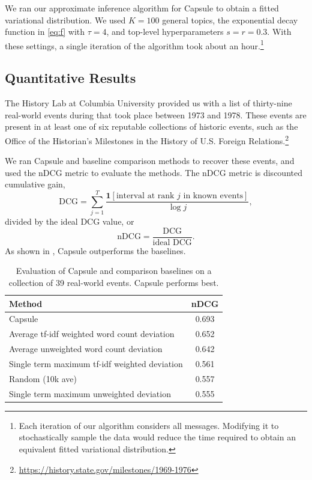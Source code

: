 
We ran our approximate inference algorithm for Capsule to obtain a
fitted variational distribution. We used $K=100$ general topics, the
exponential decay function in \cref{eq:f} with $\tau=4$, and top-level
hyperparameters $s=r=0.3$. With these settings, a single iteration of
the algorithm took about an hour.\footnote{Each iteration of our
  algorithm considers all messages. Modifying it to stochastically
  sample the data would reduce the time required to obtain an
  equivalent fitted variational distribution.}

\subsection{Quantitative Results}

The History Lab at Columbia University provided us with a list of
thirty-nine real-world events during that took place between 1973 and
1978. These events are present in at least one of six reputable
collections of historic events, such as the Office of the Historian's
Milestones in the History of U.S. Foreign
Relations.\footnote{\url{https://history.state.gov/milestones/1969-1976}}

We ran Capsule and baseline comparison methods to recover these events, and used the nDCG metric to evaluate the methods.  The nDCG metric is discounted cumulative gain,
\begin{equation}
\mbox{DCG} = \sum_{j=1}^T \frac{\mathbf{1}[\mbox{interval at rank $j$ in known events}]}{\log j},
\end{equation}
divided by the ideal DCG value, or
\begin{equation}
\mbox{nDCG} = \frac{\mbox{DCG}}{\mbox{ideal DCG}}.
\end{equation}
As shown in , Capsule outperforms the baselines.
\begin{table}[bt]
\centering
\begin{tabular}{l c}
\toprule
\textbf{Method} & \textbf{nDCG} \\
\midrule
Capsule & 0.693 \\
Average tf-idf weighted word count deviation & 0.652 \\
Average unweighted word count deviation & 0.642 \\
Single term maximum tf-idf weighted deviation & 0.561 \\
Random (10k ave) & 0.557 \\
Single term maximum unweighted deviation & 0.555 \\
\bottomrule
\end{tabular}
\caption{Evaluation of Capsule and comparison baselines on a collection of 39 real-world events.  Capsule performs best.}
\label{table:cables:ndcg}
\end{table}

